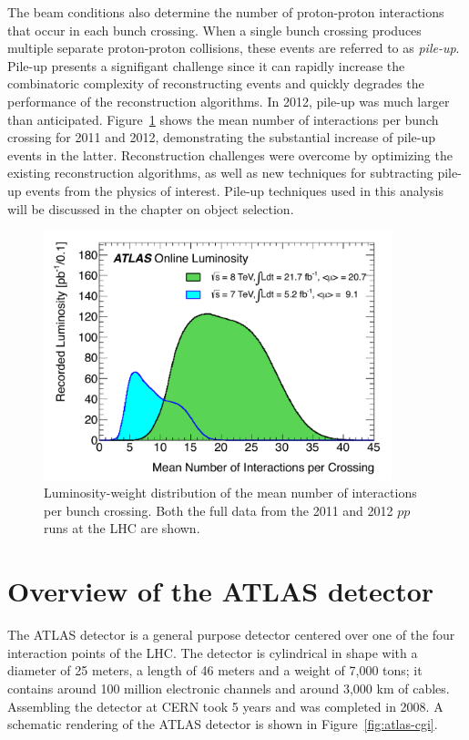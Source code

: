 The beam conditions also determine the number of proton-proton interactions that occur in each bunch crossing. When a single bunch crossing produces multiple separate proton-proton collisions, these events are referred to as \textit{pile-up}. Pile-up presents a signifigant challenge since it can rapidly increase the combinatoric complexity of reconstructing events and quickly degrades the performance of the reconstruction algorithms. In 2012, pile-up was much larger than anticipated. Figure~\ref{fig:atlas-pileup} shows the mean number of interactions per bunch crossing for 2011 and 2012, demonstrating the substantial increase of pile-up events in the latter. Reconstruction challenges were overcome by optimizing the existing reconstruction algorithms, as well as new techniques for subtracting pile-up events from the physics of interest. Pile-up techniques used in this analysis will be discussed in the chapter on object selection.

\begin{figure}[tp]
  \centering
  \includegraphics[width=0.90\textwidth]{fig/atlas/pileup.pdf}
  \caption{Luminosity-weight distribution of the mean number of interactions per bunch crossing. Both the full data from the 2011 and 2012 $pp$ runs at the LHC are shown.}
  \label{fig:atlas-pileup}
\end{figure}



\section{Overview of the ATLAS detector}
The ATLAS detector is a general purpose detector centered over one of the four interaction points of the LHC. The detector is cylindrical in shape with a diameter of 25 meters, a length of 46 meters and a weight of 7,000 tons; it contains around 100 million electronic channels and around 3,000 km of cables. Assembling the detector at CERN took 5 years and was completed in 2008. A schematic rendering of the ATLAS detector is shown in Figure~\ref{fig:atlas-cgi}.

